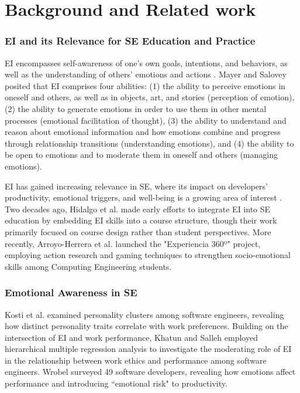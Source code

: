 \section{Background and Related work}
\subsubsection{EI and its Relevance for SE Education and Practice} EI encompasses self-awareness of one’s own goals, intentions, and behaviors, as well as the understanding of others' emotions and actions \cite{mayer2008human}. Mayer and Salovey \cite{mayer1997emotional} posited that EI comprises four abilities: (1) the ability to perceive emotions in oneself and others, as well as in objects, art, and stories (perception of emotion), (2) the ability to generate emotions in order to use them in other mental processes (emotional facilitation of thought), (3) the ability to understand and reason about emotional information and how emotions combine and progress through relationship transitions (understanding emotions), and (4) the ability to be open to emotions and to moderate them in oneself and others (managing emotions). %

EI has gained increasing relevance in SE, where its impact on developers' productivity, emotional triggers, and well-being is a growing area of interest \cite{novielli2019sentiment}. Two decades ago, Hidalgo et al. \cite{hidalgo2004use} made early efforts to integrate EI into SE education by embedding EI skills into a course structure, though their work primarily focused on course design rather than student perspectives. More recently, Arroyo-Herrera et al. \cite{arroyo2019development} launched the "Experiencia 360º" project, employing action research and gaming techniques to strengthen socio-emotional skills among Computing Engineering students.



\subsubsection{Emotional Awareness in SE} 
Kosti et al. \cite{kosti2014personality} examined personality clusters among software engineers, revealing how distinct personality traits correlate with work preferences. Building on the intersection of EI and work performance, Khatun and Salleh \cite{Khatun2020moderation} employed hierarchical multiple regression analysis to investigate the moderating role of EI in the relationship between work ethics and performance among software engineers. Wrobel \cite{wrobel2013emotions} surveyed 49 software developers, revealing how emotions affect performance and introducing ``emotional risk" to productivity.


